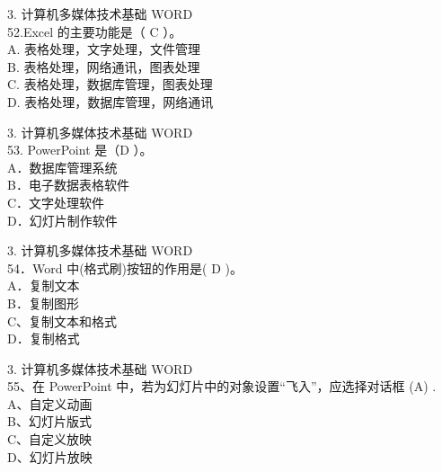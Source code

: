 \documentclass[aspectratio=169]{beamer}
\begin{document}
\begin{frame}[t]{3. 计算机多媒体技术基础} \vspace{20pt}
    WORD\\

52.Excel 的主要功能是（ C ）。\\

A. 表格处理，文字处理，文件管理\\ B. 表格处理，网络通讯，图表处理\\
C. 表格处理，数据库管理，图表处理\\ D. 表格处理，数据库管理，网络通讯\\
\end{frame}

\begin{frame}[t]{3. 计算机多媒体技术基础} \vspace{20pt}
    WORD\\

53. PowerPoint 是（D ）。\\
A．数据库管理系统\\ B．电子数据表格软件\\
C．文字处理软件\\ D．幻灯片制作软件\\
\end{frame}




\begin{frame}[t]{3. 计算机多媒体技术基础} \vspace{20pt}
    WORD\\
54．Word 中(格式刷)按钮的作用是( D )。\\
A．复制文本\\ B．复制图形\\
C、复制文本和格式\\ D．复制格式\\
\end{frame}




\begin{frame}[t]{3. 计算机多媒体技术基础} \vspace{20pt}
    WORD\\
55、在 PowerPoint 中，若为幻灯片中的对象设置“飞入”，应选择对话框 (A) .
A、自定义动画\\ B、幻灯片版式\\ C、自定义放映\\ D、幻灯片放映\\
\end{frame}
\end{document}
